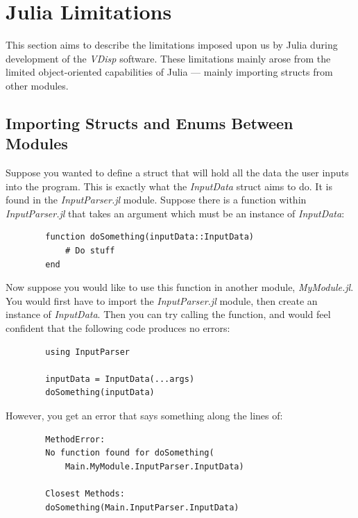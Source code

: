 \documentclass[11pt,fleqn]{article}
\newcommand{\indentpar}{\phantom{=}}
\begin{document}
    \section*{Julia Limitations} \label{juliaLimits}

    \indentpar This section aims to describe the limitations imposed
    upon us by Julia during development of the \emph{VDisp} software.
    These limitations mainly arose from the limited object-oriented capabilities
    of Julia — mainly importing structs from other modules.

    \subsection*{Importing Structs and Enums Between Modules}


        \indentpar Suppose you wanted to define a struct that will hold all the 
        data the user inputs into the program. This is exactly what the \emph{InputData}
        struct aims to do. It is found in the \emph{InputParser.jl} module. Suppose 
        there is a function within \emph{InputParser.jl} that takes an argument which
        must be an instance of \emph{InputData}:
        
        \begin{verbatim}
        function doSomething(inputData::InputData)
            # Do stuff
        end
        \end{verbatim}

        \indentpar Now suppose you would like to use this function in another module,
        \emph{MyModule.jl}. You would first have to import the \emph{InputParser.jl}
        module, then create an instance of \emph{InputData}. Then you can try calling
        the function, and would feel confident that the following code produces no errors:

        \begin{verbatim}
        using InputParser

        inputData = InputData(...args)
        doSomething(inputData)
        \end{verbatim}

        \indentpar However, you get an error that says something along the lines of:

        \begin{verbatim}
        MethodError: 
        No function found for doSomething(
            Main.MyModule.InputParser.InputData)

        Closest Methods:
        doSomething(Main.InputParser.InputData)
        \end{verbatim}
\end{document}
